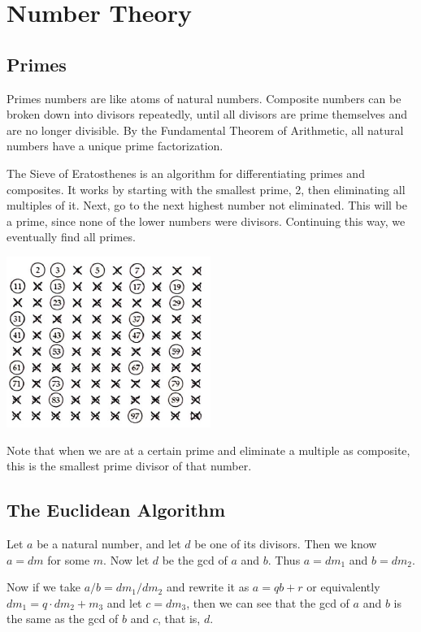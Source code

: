 \documentclass[../main.tex]{subfiles}
\begin{document}
\section{Number Theory}

\subsection{Primes}

Primes numbers are like atoms of natural numbers.
Composite numbers can be broken down into divisors repeatedly,
until all divisors are prime themselves and are no longer divisible.
By the Fundamental Theorem of Arithmetic,
all natural numbers have a unique prime factorization.

The Sieve of Eratosthenes is an algorithm for differentiating primes and composites.
It works by starting with the smallest prime, 2,
then eliminating all multiples of it.
Next, go to the next highest number not eliminated.
This will be a prime, since none of the lower numbers were divisors.
Continuing this way, we eventually find all primes.

\includegraphics{fig/num/1.png}

Note that when we are at a certain prime and eliminate a multiple as composite,
this is the smallest prime divisor of that number.

\subsection{The Euclidean Algorithm}

Let \( a \) be a natural number,
and let \( d \) be one of its divisors.
Then we know \( a = dm \) for some \( m \).
Now let \( d \) be the gcd of \( a \) and \( b \).
Thus \( a = dm_1 \) and \( b = dm_2 \).

Now if we take \( a/b = dm_1/dm_2 \)
and rewrite it as \( a = qb + r \) or equivalently
\( dm_1 = q \cdot dm_2 + m_3 \)
and let \( c = dm_3 \),
then we can see that the gcd of \( a \) and \( b \)
is the same as the gcd of \( b \) and \( c \), that is, \( d \).
\end{document}

